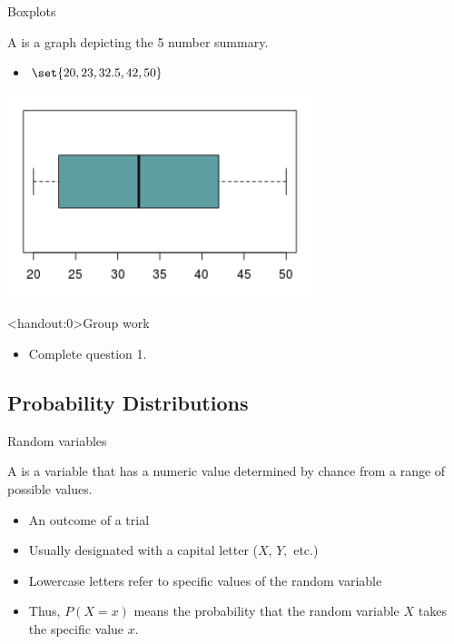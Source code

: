 \documentclass[xcolor=table, aspectratio=169, bigger, handout]{beamer}
\begin{document}
\begin{frame}{Boxplots}
\begin{block}{}
A  is a graph depicting the 5 number summary.
\begin{itemize}
\item $\set{20,  23, 32.5, 42, 50}$
\end{itemize}
\end{block}
{\centering
\includegraphics[width=3.5in]{../images/wk05_boxplot}\par
}
\end{frame}


\begin{frame}<handout:0>{Group work}
\begin{block}{}
\large
\begin{itemize}
\item Complete question 1.
\end{itemize}
\end{block}
\end{frame}



%
%
\subsection{Probability Distributions}

\begin{frame}{Random variables}
\begin{block}{}
A  is a variable that has a numeric value determined by chance from a range of possible values.

\begin{itemize}
\pause\item An outcome of a trial
\pause\item Usually designated with a capital letter ($X, \, Y,$ etc.)
\pause\item Lowercase letters refer to specific values of the random variable
\pause\item Thus, $P(X=x)$ means the probability that the random variable $X$ takes the specific value $x$.
\end{itemize}
\end{block}
\end{frame}
\end{document}
